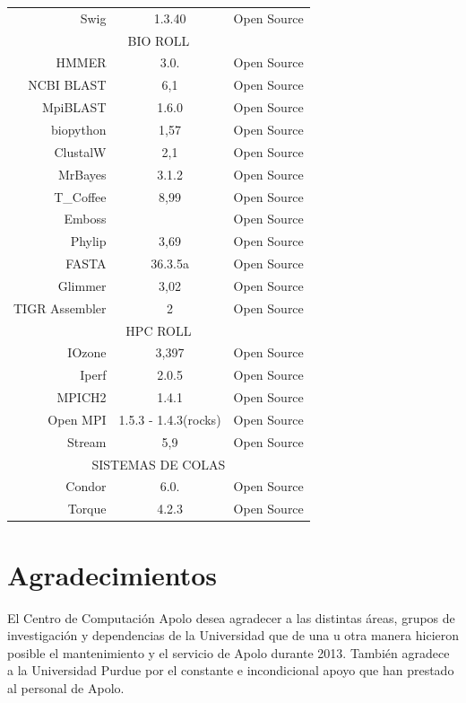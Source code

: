 \begin{table}[htbp]
{\begin{tabular}{rcr}
    Swig  & 1.3.40 & Open Source \\
    \multicolumn{3}{c}{BIO ROLL} \\
    HMMER & 3.0.  & Open Source \\
    NCBI BLAST & 6,1   & Open Source \\
    MpiBLAST & 1.6.0 & Open Source \\
    biopython & 1,57  & Open Source \\
    ClustalW & 2,1   & Open Source \\
    MrBayes & 3.1.2 & Open Source \\
    T\_Coffee & 8,99  & Open Source \\
    Emboss &       & Open Source \\
    Phylip & 3,69  & Open Source \\
    FASTA & 36.3.5a & Open Source \\
    Glimmer & 3,02  & Open Source \\
    TIGR Assembler & 2     & Open Source \\
    \multicolumn{3}{c}{HPC ROLL} \\
    IOzone & 3,397 & Open Source \\
    Iperf & 2.0.5 & Open Source \\
    MPICH2 & 1.4.1 & Open Source \\
    Open MPI & 1.5.3 - 1.4.3(rocks) & Open Source \\
    Stream & 5,9   & Open Source \\
    \multicolumn{3}{c}{SISTEMAS DE COLAS} \\
    Condor & 6.0.  & Open Source \\
    Torque & 4.2.3     & Open Source \\
    \hline
    \end{tabular}%
    }
  \label{tab:addlabel}%
\end{table}%




\newpage
\section{Agradecimientos}
El Centro de Computación Apolo desea agradecer a las distintas áreas, grupos de investigación y dependencias de la Universidad que de una u otra manera hicieron posible el mantenimiento y el servicio de Apolo durante 2013. También agradece a la Universidad Purdue por el constante e incondicional apoyo que han prestado al personal de Apolo.


